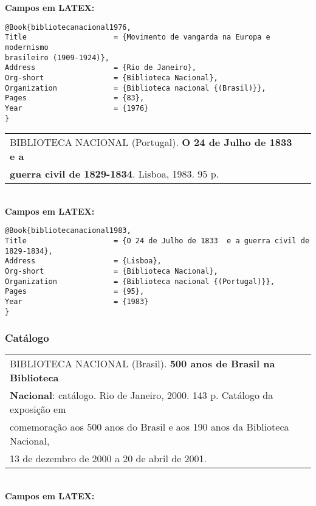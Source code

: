 \textbf{Campos em LATEX:}
	
\begingroup
\fontsize{10pt}{12pt}\selectfont
\begin{verbatim}
@Book{bibliotecanacional1976,
Title                    = {Movimento de vangarda na Europa e modernismo
brasileiro (1909-1924)},
Address                  = {Rio de Janeiro},
Org-short                = {Biblioteca Nacional},
Organization             = {Biblioteca nacional {(Brasil)}},
Pages                    = {83},
Year                     = {1976}
}\end{verbatim}
\endgroup

\begin{tabular}{|l|c|} \hline
BIBLIOTECA NACIONAL (Portugal). \textbf{O 24 de Julho de 1833 e a} \\ \textbf{guerra civil de 1829-1834}. Lisboa, 1983. 95 p.   \\\hline
\end{tabular}\\

\textbf{Campos em LATEX:}

\begingroup
\fontsize{10pt}{12pt}\selectfont
\begin{verbatim}
@Book{bibliotecanacional1983,
Title                    = {O 24 de Julho de 1833  e a guerra civil de 
1829-1834},
Address                  = {Lisboa},
Org-short                = {Biblioteca Nacional},
Organization             = {Biblioteca nacional {(Portugal)}},
Pages                    = {95},
Year                     = {1983}
}
\end{verbatim}
\endgroup
	
\subsubsection{Catálogo}
	
\begin{tabular}{|l|c|} \hline
	BIBLIOTECA NACIONAL (Brasil). \textbf{500 anos de Brasil na Biblioteca } \\ \textbf{Nacional}: catálogo. Rio de Janeiro, 2000. 143 p. Catálogo da exposição em \\comemoração aos 500  anos do Brasil e aos 190 anos da Biblioteca Nacional, \\13 de dezembro de 2000 a 20 de abril de 2001.    \\\hline
\end{tabular}\\
	
\textbf{Campos em LATEX:}
	
